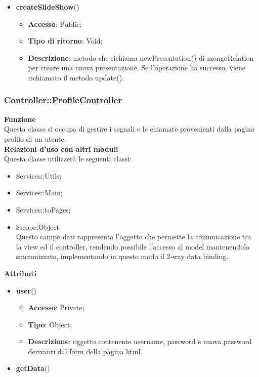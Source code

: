 {{\begin{itemize}
\begin{itemize}
			\end{itemize}
			\item \textbf{createSlideShow}()
			\begin{itemize}
				\item \textbf{Accesso}: Public;
				\item \textbf{Tipo di ritorno}: Void;
				\item \textbf{Descrizione}: metodo che richiama newPresentation() di mongoRelation per creare una nuova presentazione. Se l'operazione ha successo, viene richiamato il metodo update().
			\end{itemize}
		\end{itemize}
		}
	\subsubsection{Controller::\-ProfileController}{
		\textbf{Funzione}\\
		\indent Questa classe si occupa di gestire i segnali e le chiamate provenienti dalla pagina profilo di un utente.\\
		\textbf{Relazioni d'uso con altri moduli}\\
		\indent Questa classe utilizzerà le seguenti classi:
		\begin{itemize}
			\item Services::\-Utils;
			\item Services::\-Main;
			\item Services::\-toPages;
			\item \$scope:Object\\
				\indent Questo campo dati rappresenta l’oggetto che permette la comunicazione tra la view ed il controller, rendendo possibile l’accesso al model mantenendolo sincronizzato, implementando in questo modo il 2-way data binding.
		\end{itemize}
		\textbf{Attributi}\\
	    \begin{itemize}
	    	\item \textbf{user}()
			\begin{itemize}
				\item \textbf{Accesso}: Private;
				\item \textbf{Tipo}: Object;
				\item \textbf{Descrizione}: oggetto contenente username, password e nuova password derivanti dal form della pagina html.
			\end{itemize}
	    	\item \textbf{getData}()

\end{itemize}}}

